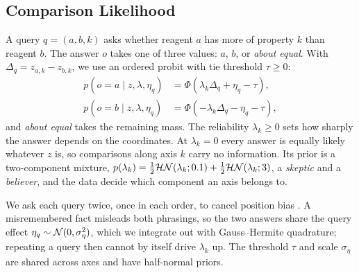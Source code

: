 \subsection{Comparison Likelihood}
\label{sec:likelihood}
A query $q=(a,b,k)$ asks whether reagent $a$ has more of property $k$ than reagent $b$. The answer $o$ takes one of three values: $a$, $b$, or \emph{about equal}. With $\Delta_q=z_{a,k}-z_{b,k}$, we use an ordered probit with tie threshold $\tau\ge0$:
\begin{equation}
\begin{aligned}
p(o{=}a\mid z,\lambda,\eta_q)&=\Phi(\lambda_k\Delta_q+\eta_q-\tau),\\
p(o{=}b\mid z,\lambda,\eta_q)&=\Phi(-\lambda_k\Delta_q-\eta_q-\tau),
\end{aligned}
\label{eq:probit}
\end{equation}
and \emph{about equal} takes the remaining mass. The reliability $\lambda_k\ge0$ sets how sharply the answer depends on the coordinates. At $\lambda_k=0$ every answer is equally likely whatever $z$ is, so comparisons along axis $k$ carry no information. Its prior is a two-component mixture, $p(\lambda_k)=\tfrac12\mathcal{HN}(\lambda_k;0.1)+\tfrac12\mathcal{HN}(\lambda_k;3)$, a \emph{skeptic} and a \emph{believer}, and the data decide which component an axis belongs to.

We ask each query twice, once in each order, to cancel position bias \citep{wang2024fair}. A misremembered fact misleads both phrasings, so the two answers share the query effect $\eta_q\sim\mathcal{N}(0,\sigma_\eta^2)$, which we integrate out with Gauss--Hermite quadrature; repeating a query then cannot by itself drive $\lambda_k$ up. The threshold $\tau$ and scale $\sigma_\eta$ are shared across axes and have half-normal priors.

